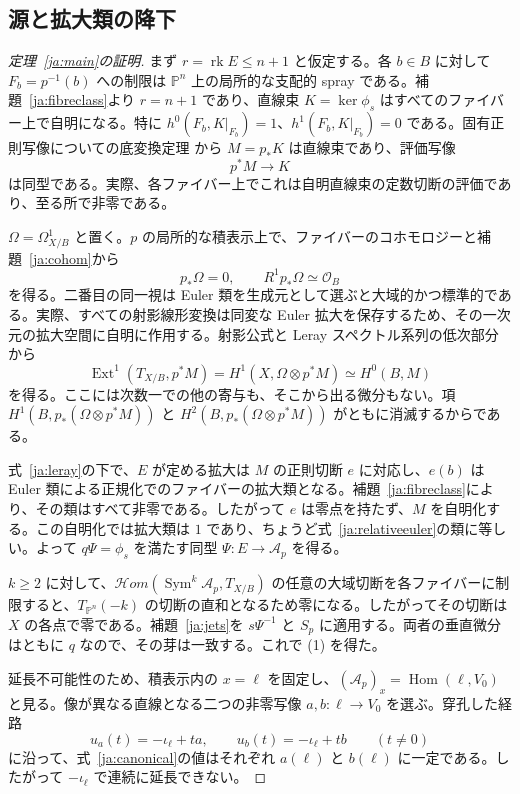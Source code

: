 \documentclass[12pt]{amsart}
\theoremstyle{definition}
\theoremstyle{remark}
\numberwithin{equation}{section}
\newcommand{\rk}{\operatorname{rk}}
\newcommand{\Hom}{\mathscr{H}\!\mathit{om}}
\DeclareMathOperator{\Homop}{Hom}
\newcommand{\cA}{\mathcal{A}}
\newcommand{\cO}{\mathcal{O}}
\DeclareMathOperator{\Sym}{Sym}
\newcommand{\mP}{\mathbb{P}}
\DeclareMathOperator{\Ext}{Ext}
\begin{document}
\subsection{源と拡大類の降下}
\begin{proof}[定理~\ref{ja:main}の証明]
まず $r=\rk E\leq n+1$ と仮定する。各 $b\in B$ に対して $F_b=p^{-1}(b)$ への制限は $\mP^n$ 上の局所的な支配的 spray である。補題~\ref{ja:fibreclass}より $r=n+1$ であり、直線束 $K=\ker\phi_s$ はすべてのファイバー上で自明になる。特に $h^0(F_b,K|_{F_b})=1$、$h^1(F_b,K|_{F_b})=0$ である。固有正則写像についての底変換定理 \cite{ja:Grauert} から $M=p_*K$ は直線束であり、評価写像
\[
p^*M\longrightarrow K
\]
は同型である。実際、各ファイバー上でこれは自明直線束の定数切断の評価であり、至る所で非零である。

$\Omega=\Omega^1_{X/B}$ と置く。$p$ の局所的な積表示上で、ファイバーのコホモロジーと補題~\ref{ja:cohom}から
\[
p_*\Omega=0,\qquad R^1p_*\Omega\simeq\cO_B
\]
を得る。二番目の同一視は Euler 類を生成元として選ぶと大域的かつ標準的である。実際、すべての射影線形変換は同変な Euler 拡大を保存するため、その一次元の拡大空間に自明に作用する。射影公式と Leray スペクトル系列の低次部分から
\begin{equation}\label{ja:leray}
\Ext^1(T_{X/B},p^*M)
=H^1(X,\Omega\otimes p^*M)
\simeq H^0(B,M)
\end{equation}
を得る。ここには次数一での他の寄与も、そこから出る微分もない。項 $H^1(B,p_*(\Omega\otimes p^*M))$ と $H^2(B,p_*(\Omega\otimes p^*M))$ がともに消滅するからである。

式~\eqref{ja:leray}の下で、$E$ が定める拡大は $M$ の正則切断 $e$ に対応し、$e(b)$ は Euler 類による正規化でのファイバーの拡大類となる。補題~\ref{ja:fibreclass}により、その類はすべて非零である。したがって $e$ は零点を持たず、$M$ を自明化する。この自明化では拡大類は $1$ であり、ちょうど式~\eqref{ja:relativeeuler}の類に等しい。よって $q\Psi=\phi_s$ を満たす同型 $\Psi:E\to\cA_p$ を得る。

$k\geq2$ に対して、$\Hom(\Sym^k\cA_p,T_{X/B})$ の任意の大域切断を各ファイバーに制限すると、$T_{\mP^n}(-k)$ の切断の直和となるため零になる。したがってその切断は $X$ の各点で零である。補題~\ref{ja:jets}を $s\Psi^{-1}$ と $S_p$ に適用する。両者の垂直微分はともに $q$ なので、その芽は一致する。これで (1) を得た。

延長不可能性のため、積表示内の $x=\ell$ を固定し、$(\cA_p)_x=\Homop(\ell,V_0)$ と見る。像が異なる直線となる二つの非零写像 $a,b:\ell\to V_0$ を選ぶ。穿孔した経路
\[
u_a(t)=-\iota_\ell+ta,\qquad
u_b(t)=-\iota_\ell+tb\qquad(t\ne0)
\]
に沿って、式~\eqref{ja:canonical}の値はそれぞれ $a(\ell)$ と $b(\ell)$ に一定である。したがって $-\iota_\ell$ で連続に延長できない。


\end{proof}
\end{document}

